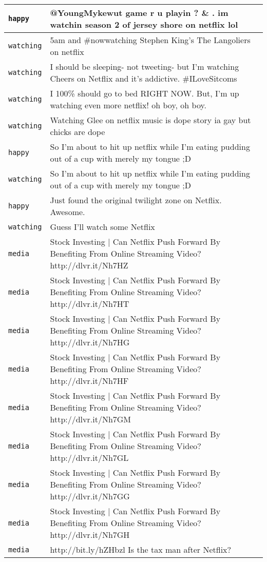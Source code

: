 {\begin{longtable}{|l|p{160mm}|}
      \tabularnewline\hline
         \texttt{happy} & @YoungMykewut game r u playin ? \& . im watchin season 2 of jersey shore on netflix lol
      \tabularnewline\hline
         \texttt{watching} & 5am and \#nowwatching Stephen King's The Langoliers on netflix
      \tabularnewline\hline
         \texttt{watching} & I should be sleeping- not tweeting- but I'm watching Cheers on Netflix and it's addictive. \#ILoveSitcoms
      \tabularnewline\hline
         \texttt{watching} & I 100\% should go to bed RIGHT NOW. But, I'm up watching even more netflix! oh boy, oh boy.
      \tabularnewline\hline
         \texttt{watching} & Watching Glee on netflix music is dope story ia gay but chicks are dope
      \tabularnewline\hline
         \texttt{happy} & So I'm about to hit up netflix while I'm eating pudding out of a cup with merely my tongue ;D
      \tabularnewline\hline
         \texttt{watching} & So I'm about to hit up netflix while I'm eating pudding out of a cup with merely my tongue ;D
      \tabularnewline\hline
         \texttt{happy} & Just found the original twilight zone on Netflix. Awesome.
      \tabularnewline\hline
         \texttt{watching} & Guess I'll watch some Netflix
      \tabularnewline\hline
         \texttt{media} & Stock Investing | Can Netflix Push Forward By Benefiting From Online Streaming Video? http://dlvr.it/Nh7HZ
      \tabularnewline\hline
         \texttt{media} & Stock Investing | Can Netflix Push Forward By Benefiting From Online Streaming Video? http://dlvr.it/Nh7HT
      \tabularnewline\hline
         \texttt{media} & Stock Investing | Can Netflix Push Forward By Benefiting From Online Streaming Video? http://dlvr.it/Nh7HG
      \tabularnewline\hline
         \texttt{media} & Stock Investing | Can Netflix Push Forward By Benefiting From Online Streaming Video? http://dlvr.it/Nh7HF
      \tabularnewline\hline
         \texttt{media} & Stock Investing | Can Netflix Push Forward By Benefiting From Online Streaming Video? http://dlvr.it/Nh7GM
      \tabularnewline\hline
         \texttt{media} & Stock Investing | Can Netflix Push Forward By Benefiting From Online Streaming Video? http://dlvr.it/Nh7GL
      \tabularnewline\hline
         \texttt{media} & Stock Investing | Can Netflix Push Forward By Benefiting From Online Streaming Video? http://dlvr.it/Nh7GG
      \tabularnewline\hline
         \texttt{media} & Stock Investing | Can Netflix Push Forward By Benefiting From Online Streaming Video? http://dlvr.it/Nh7GH
      \tabularnewline\hline
         \texttt{media} & http://bit.ly/hZHbzl Is the tax man after Netflix?
      \tabularnewline\hline

\end{longtable}}
